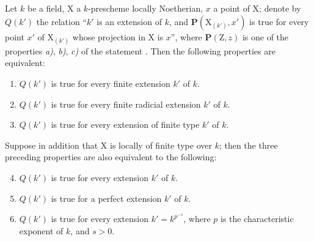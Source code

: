 \begin{proposition}[6.7.7]
\label{IV.6.7.7}
Let $k$ be a field, $\mathrm{X}$ a $k$-prescheme locally Noetherian, $x$ a point of $\mathrm{X}$; denote by $Q(k')$ the relation ``$k'$ is an extension of $k$, and $\boldsymbol{P}(\mathrm{X}_{(k')},x')$ is true for every point $x'$ of $\mathrm{X}_{(k')}$ whose projection in $\mathrm{X}$ is $x$'', where $\boldsymbol{P}(\mathrm{Z},z)$ is one of the properties \emph{a)}, \emph{b)}, \emph{c)} of the statement . Then the following properties are equivalent:
\begin{enumerate}[label=\emph{\alph*)}]
  \item $Q(k')$ is true for every finite extension $k'$ of $k$.
  \item $Q(k')$ is true for every finite radicial extension $k'$ of $k$.
  \item $Q(k')$ is true for every extension of finite type $k'$ of $k$.
\end{enumerate}
Suppose in addition that $\mathrm{X}$ is locally of finite type over $k$; then the three preceding properties are also equivalent to the following:
\begin{enumerate}[label=\emph{\alph*)}]
\setcounter{enumi}{3}
  \item $Q(k')$ is true for every extension $k'$ of $k$.
  \item $Q(k')$ is true for a perfect extension $k'$ of $k$.
  \item $Q(k')$ is true for every extension $k'=k^{p^{-s}}$, where $p$ is the characteristic exponent of $k$, and $s>0$.
\end{enumerate}
\end{proposition}

